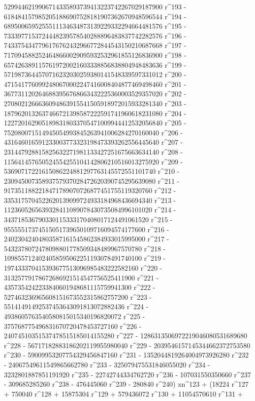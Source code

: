        5299446219906714335893739413223742267029187900 r^193 - 
       6184841579852051886907528181907362670948596544 r^194 - 
       6895006595255511134634873139229332294664481576 r^195 - 
       7333977153724448239578540288896483837742282576 r^196 - 
       7433754347796176762432966772844543150210687668 r^197 - 
       7170945882524648660029095932532961855126836900 r^198 - 
       6574263891157619720021603338856838804948483636 r^199 - 
       5719873644570716232030259380141548339597331012 r^200 - 
       4715417760992480670002247416008404877469498460 r^201 - 
       3677311202646883956768663432225360003529357020 r^202 - 
       2708021266636094863915541505918972015933281340 r^203 - 
       1879620132637466721398587222591741960618231080 r^204 - 
       1227201629051898318033705471009944412532056840 r^205 - 
       752080071514945054993845263941006284270160040 r^206 - 
       431646016591233003773323198473393262556445640 r^207 - 
       231447928815825632271981133427251675663634140 r^208 - 
       115641457650524554255104142806210516013275920 r^209 - 
       53690717221615086224881297763145572551101740 r^210 - 
       23094500735893757937028472620390745295639080 r^211 - 
       9173511882218471789070726877451755119320760 r^212 - 
       3353175704522620139099724933184968436694340 r^213 - 
       1123605265639328411089078430735084996101020 r^214 - 
       343718536790330115333170408017124491061520 r^215 - 
       95555517374515051739650109716094574177600 r^216 - 
       24023042404803587161545862384933015995000 r^217 - 
       5432378072478098801778509348489967570780 r^218 - 
       1098557124024058595062251193078491740100 r^219 - 
       197433370415393677513096985483222582160 r^220 - 
       31325779178672686921514547756525411900 r^221 - 
       4357354242233840601948681115759941300 r^222 - 
       527463236965608151673552315862757200 r^223 - 
       55141491492537453643091813072882436 r^224 - 
       4938605763540580815015340196820072 r^225 - 
       375768775496831670720478453727160 r^226 - 
       24074510351537478515185014155280 r^227 - 
       1286313506972219046080531689680 r^228 - 
       56717182883186202119955980040 r^229 - 
       2039546157145344662372753580 r^230 - 
       59009953207754329456847160 r^231 - 
       1352044819264004973926280 r^232 - 
       24067549611549865662780 r^233 - 325079475531846055020 r^234 - 
       3232801887851191920 r^235 - 22742744334762720 r^236 - 
       107031550350660 r^237 - 309685285260 r^238 - 476445060 r^239 - 
       280840 r^240) xn^123 + (18224 r^127 + 750040 r^128 + 
       15875304 r^129 + 579436072 r^130 + 11054570610 r^131 + 
